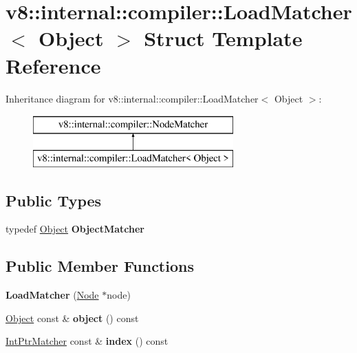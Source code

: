 \hypertarget{structv8_1_1internal_1_1compiler_1_1_load_matcher}{}\section{v8\+:\+:internal\+:\+:compiler\+:\+:Load\+Matcher$<$ Object $>$ Struct Template Reference}
\label{structv8_1_1internal_1_1compiler_1_1_load_matcher}
Inheritance diagram for v8\+:\+:internal\+:\+:compiler\+:\+:Load\+Matcher$<$ Object $>$\+:\begin{figure}[H]
\begin{center}
\leavevmode
\includegraphics[height=2.000000cm]{structv8_1_1internal_1_1compiler_1_1_load_matcher}
\end{center}
\end{figure}
\subsection*{Public Types}
\begin{DoxyCompactItemize}
\item 
typedef \hyperlink{classv8_1_1internal_1_1_object}{Object} {\bfseries Object\+Matcher}\hypertarget{structv8_1_1internal_1_1compiler_1_1_load_matcher_a10a4b7ab7a3abdca34529ae3d06aa36e}{}\label{structv8_1_1internal_1_1compiler_1_1_load_matcher_a10a4b7ab7a3abdca34529ae3d06aa36e}

\end{DoxyCompactItemize}
\subsection*{Public Member Functions}
\begin{DoxyCompactItemize}
\item 
{\bfseries Load\+Matcher} (\hyperlink{classv8_1_1internal_1_1compiler_1_1_node}{Node} $\ast$node)\hypertarget{structv8_1_1internal_1_1compiler_1_1_load_matcher_a6d34070b4c5e21c21c0a884f28f5abe2}{}\label{structv8_1_1internal_1_1compiler_1_1_load_matcher_a6d34070b4c5e21c21c0a884f28f5abe2}

\item 
\hyperlink{classv8_1_1internal_1_1_object}{Object} const \& {\bfseries object} () const \hypertarget{structv8_1_1internal_1_1compiler_1_1_load_matcher_a7ffc47e40759b47d22765a8556f05704}{}\label{structv8_1_1internal_1_1compiler_1_1_load_matcher_a7ffc47e40759b47d22765a8556f05704}

\item 
\hyperlink{structv8_1_1internal_1_1compiler_1_1_int_matcher}{Int\+Ptr\+Matcher} const \& {\bfseries index} () const \hypertarget{structv8_1_1internal_1_1compiler_1_1_load_matcher_a168566866f0449651d778b77b0c53f6a}{}\label{structv8_1_1internal_1_1compiler_1_1_load_matcher_a168566866f0449651d778b77b0c53f6a}

\end{DoxyCompactItemize}
